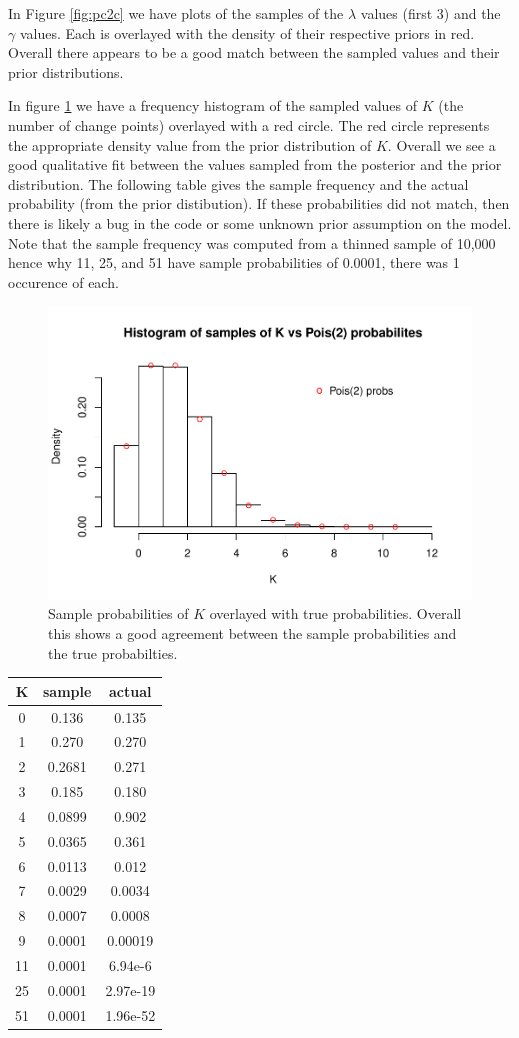 \documentclass[11pt,a4paper]{article}
\numberwithin{equation}{section}
\begin{document}
In Figure \ref{fig:pc2c} we have plots of the samples of the \(\lambda\)
values (first 3) and the \(\gamma\) values. Each is overlayed with the
density of their respective priors in red. Overall there appears to be a
good match between the sampled values and their prior distributions.

In figure \ref{fig:pois_hist} we have a frequency histogram of the
sampled values of \(K\) (the number of change points) overlayed with a
red circle. The red circle represents the appropriate density value from
the prior distribution of \(K\). Overall we see a good qualitative fit
between the values sampled from the posterior and the prior
distribution. The following table gives the sample frequency and the
actual probability (from the prior distibution). If these probabilities
did not match, then there is likely a bug in the code or some unknown
prior assumption on the model. Note that the sample frequency was
computed from a thinned sample of 10,000 hence why 11, 25, and 51 have
sample probabilities of 0.0001, there was 1 occurence of each.

\begin{figure}
\centering
\includegraphics{thesis_draft_files/figure-latex/unnamed-chunk-3-1.pdf}
\caption{\label{fig:pois_hist} Sample probabilities of \(K\) overlayed
with true probabilities. Overall this shows a good agreement between the
sample probabilities and the true probabilties.}
\end{figure}

\begin{longtable}[]{@{}ccc@{}}
\toprule
K & sample & actual\tabularnewline
\midrule
\endhead
0 & 0.136 & 0.135\tabularnewline
1 & 0.270 & 0.270\tabularnewline
2 & 0.2681 & 0.271\tabularnewline
3 & 0.185 & 0.180\tabularnewline
4 & 0.0899 & 0.902\tabularnewline
5 & 0.0365 & 0.361\tabularnewline
6 & 0.0113 & 0.012\tabularnewline
7 & 0.0029 & 0.0034\tabularnewline
8 & 0.0007 & 0.0008\tabularnewline
9 & 0.0001 & 0.00019\tabularnewline
11 & 0.0001 & 6.94e-6\tabularnewline
25 & 0.0001 & 2.97e-19\tabularnewline
51 & 0.0001 & 1.96e-52\tabularnewline
\bottomrule
\end{longtable}
\end{document}
